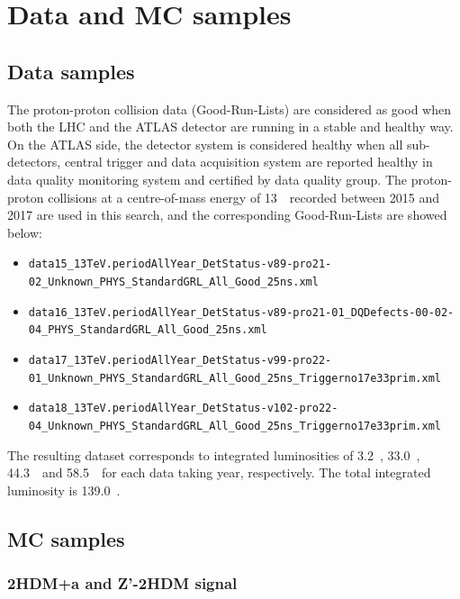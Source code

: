 \chapter{Data and MC samples}
\label{ch:ana-intro}

\section{Data samples}

\par The proton-proton collision data (Good-Run-Lists) are considered as good when both the LHC and the ATLAS detector are running in a stable and healthy way.
On the ATLAS side, the detector system is considered healthy when all sub-detectors, central trigger and data acquisition system are reported healthy in data quality monitoring system and certified by data quality group. 
The proton-proton collisions at a centre-of-mass energy of 13~\TeV~recorded between 2015 and 2017 are used in this search, and the corresponding Good-Run-Lists are showed below: 

\begin{itemize}
	\tiny
	\item \texttt{data15\_13TeV.periodAllYear\_DetStatus-v89-pro21-02\_Unknown\_PHYS\_StandardGRL\_All\_Good\_25ns.xml}
	\item \texttt{data16\_13TeV.periodAllYear\_DetStatus-v89-pro21-01\_DQDefects-00-02-04\_PHYS\_StandardGRL\_All\_Good\_25ns.xml}
	\item \texttt{data17\_13TeV.periodAllYear\_DetStatus-v99-pro22-01\_Unknown\_PHYS\_StandardGRL\_All\_Good\_25ns\_Triggerno17e33prim.xml}
	\item \texttt{data18\_13TeV.periodAllYear\_DetStatus-v102-pro22-04\_Unknown\_PHYS\_StandardGRL\_All\_Good\_25ns\_Triggerno17e33prim.xml}
\end{itemize}

\par The resulting dataset corresponds to integrated luminosities of 3.2~\ifb, 33.0~\ifb, 44.3~\ifb\ and 58.5~\ifb\ for each data taking year, respectively. 
The total integrated luminosity is 139.0~\ifb.

\section{MC samples}
\label{ch:data-mc-samples}

\subsection{2HDM+a and Z'-2HDM signal}
\label{subsec:signal}

